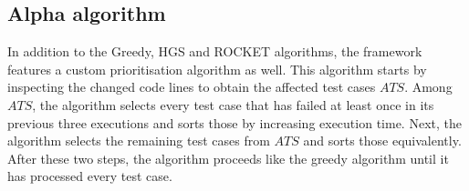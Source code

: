 \subsection{Alpha algorithm}
\noindent In addition to the Greedy, HGS and ROCKET algorithms, the framework features a custom prioritisation algorithm as well. This algorithm starts by inspecting the changed code lines to obtain the affected test cases $ATS$. Among $ATS$, the algorithm selects every test case that has failed at least once in its previous three executions and sorts those by increasing execution time. Next, the algorithm selects the remaining test cases from $ATS$ and sorts those equivalently. After these two steps, the algorithm proceeds like the greedy algorithm until it has processed every test case.